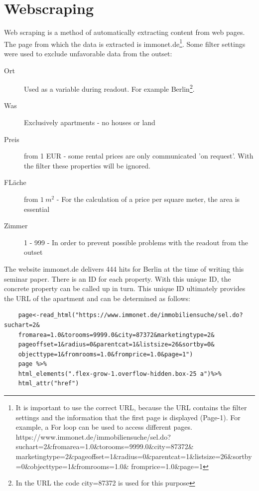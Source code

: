 \chapter{Webscraping} \label{sec:Webscraping}
Web scraping is a method of automatically extracting content from web pages. The page from which the data is extracted is \hyperref[https://www.immonet.de/immobiliensuche/sel.do?suchart=2&fromarea=1.0&torooms=9999.0&city=87372&marketingtype=2&pageoffset=1&radius=0&parentcat=1&listsize=26&sortby=0&objecttype=1&fromrooms=1.0&fromprice=1.0&page=1]{}{}{}{immonet.de}\footnote{ It is important to use the correct URL, because the URL contains the filter settings and the information that the first page is displayed (Page-1). For example, a For loop can be used to access different pages. \hyperref[https://www.immonet.de/immobiliensuche/sel.do?suchart=2&fromarea=1.0&torooms=9999.0&city=87372&marketingtype=2&pageoffset=1&radius=0&parentcat=1&listsize=26&sortby=0&objecttype=1&fromrooms=1.0&fromprice=1.0&page=2]{}{}{}{https://www.immonet.de/immobiliensuche/sel.do?suchart=2\&fromarea=1.0\&torooms=9999.0\&city=87372\& marketingtype=2\&pageoffset=1\&radius=0\&parentcat=1\&listsize=26\&sortby=0\&objecttype=1\&fromrooms=1.0\& fromprice=1.0\&page=1}}. Some filter settings were used to exclude unfavorable data from the outset:

\begin{description}
	\item[Ort] Used as a variable during readout. For example Berlin\footnote{In the URL the code city=87372 is used for this purpose}.
	\item[Was] Exclusively apartments - no houses or land 
	\item[Preis] from  1 EUR -  some rental prices are only communicated 'on request'. With the filter these properties will be ignored.
	\item[FLäche] from  $1 \ m^2$ -  For the calculation of a price per square meter, the area is essential
	\item[Zimmer] 1 - 999 - In order to prevent possible problems with the readout from the outset
\end{description} 

The website immonet.de delivers 444 hits for Berlin at the time of writing this seminar paper. There is an ID for each property. With this unique ID, the concrete property can be called up in turn. This unique ID ultimately provides the URL of the apartment and can be determined as follows:

\begin{verbatim}
	page<-read_html("https://www.immonet.de/immobiliensuche/sel.do?suchart=2&
	fromarea=1.0&torooms=9999.0&city=87372&marketingtype=2&
	pageoffset=1&radius=0&parentcat=1&listsize=26&sortby=0&
	objecttype=1&fromrooms=1.0&fromprice=1.0&page=1")
	page %>%
	html_elements(".flex-grow-1.overflow-hidden.box-25 a")%>%
	html_attr("href")
\end{verbatim}

